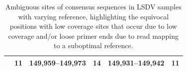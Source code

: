 \begin{table}[ht]
\begin{tabular}{l|llc|lc}
											& 11           & 149,959--149,973                                                                            & 14                                                                    & 149,931--149,942                                                                           & 11                                                                    \\ \hline
	\end{tabular}
	\caption[Ambiguous sites of consensus sequences in LSDV samples with varying reference.]{Ambiguous sites of consensus sequences in LSDV samples with varying reference, highlighting the equivocal positions with low coverage sites that occur due to low coverage and/or loose primer ends due to read mapping to a suboptimal reference.}
\label{tab:apx-capv-n}
\end{table}

